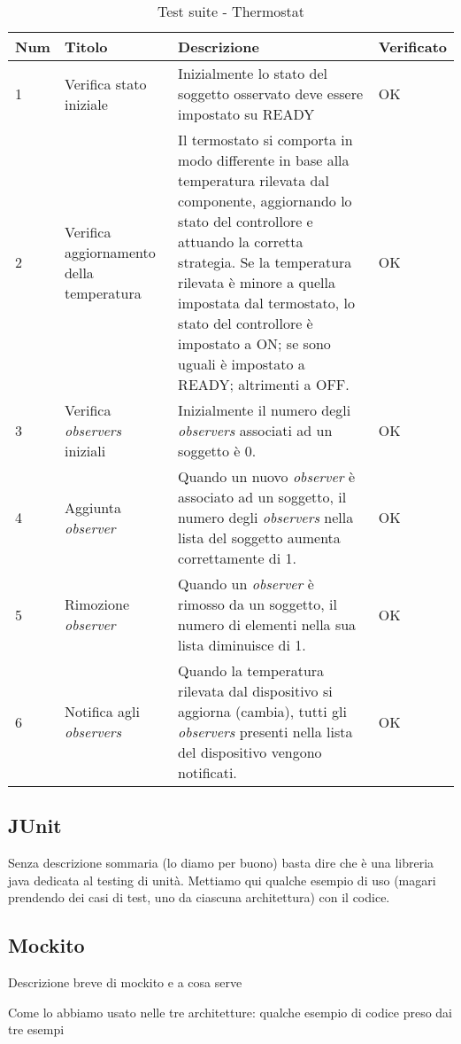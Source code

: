 \begin{table}[ht]
\caption{Test suite - Thermostat}
\centering %
\begin{tabular}{|p{1cm}|p{3cm}|p{6cm}|p{2cm}|} %
\hline\hline %
\textbf{Num} & \textbf{Titolo} & \textbf{Descrizione} & \textbf{Verificato} \\ [0.5ex] %
\hline %
1 & Verifica stato iniziale & Inizialmente lo stato del soggetto osservato deve essere impostato su READY & OK \\ \hline%
2 & Verifica aggiornamento della temperatura & Il termostato si comporta in modo differente in base alla temperatura rilevata dal componente, aggiornando lo stato del controllore e attuando la corretta strategia. Se la temperatura rilevata è minore a quella impostata dal termostato, lo stato del controllore è impostato a ON; se sono uguali è impostato a READY; altrimenti a OFF. & OK \\ \hline
3 & Verifica \emph{observers} iniziali & Inizialmente il numero degli \emph{observers} associati ad un soggetto è 0. & OK \\ \hline
4 & Aggiunta \emph{observer} & Quando un nuovo \emph{observer} è associato ad un soggetto, il numero degli \emph{observers} nella lista del soggetto aumenta correttamente di 1. & OK \\ \hline
5 & Rimozione \emph{observer} & Quando un \emph{observer} è rimosso da un soggetto, il numero di elementi nella sua lista diminuisce di 1. & OK \\ \hline
6 & Notifica agli \emph{observers} & Quando la temperatura rilevata dal dispositivo si aggiorna (cambia), tutti gli \emph{observers} presenti nella lista del dispositivo vengono notificati. & OK \\ [1ex] %
\hline %
\end{tabular}
\label{table:observerstrategy} %
\end{table}

\subsection{JUnit}

Senza descrizione sommaria (lo diamo per buono) basta dire che è una libreria java dedicata al testing di unità. Mettiamo qui qualche esempio di uso (magari prendendo dei casi di test, uno da ciascuna architettura) con il codice.

\subsection{Mockito}

Descrizione breve di mockito e a cosa serve

Come lo abbiamo usato nelle tre architetture: qualche esempio di codice preso dai tre esempi